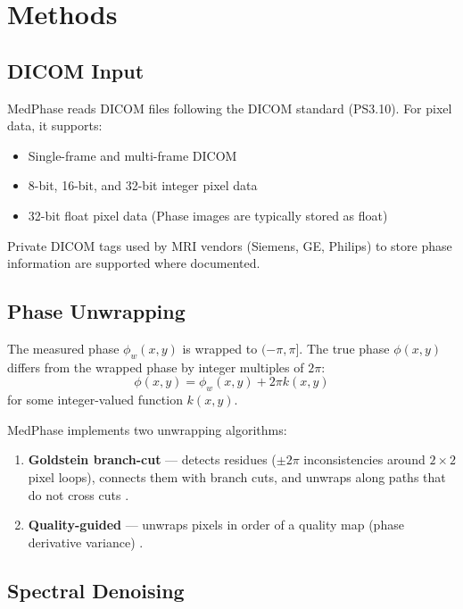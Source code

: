 \documentclass[11pt,a4paper]{article}
\begin{document}
\section{Methods}

\subsection{DICOM Input}

MedPhase reads DICOM files following the DICOM standard (PS3.10). For pixel data, it supports:
\begin{itemize}
\item Single-frame and multi-frame DICOM
\item 8-bit, 16-bit, and 32-bit integer pixel data
\item 32-bit float pixel data (Phase images are typically stored as float)
\end{itemize}

Private DICOM tags used by MRI vendors (Siemens, GE, Philips) to store phase information are supported where documented.

\subsection{Phase Unwrapping}

The measured phase $\phi_w(x,y)$ is wrapped to $(-\pi, \pi]$. The true phase $\phi(x,y)$ differs from the wrapped phase by integer multiples of $2\pi$:
\begin{equation}
\phi(x,y) = \phi_w(x,y) + 2\pi k(x,y)
\end{equation}
for some integer-valued function $k(x,y)$.

MedPhase implements two unwrapping algorithms:
\begin{enumerate}
\item \textbf{Goldstein branch-cut} — detects residues ($\pm 2\pi$ inconsistencies around $2\times2$ pixel loops), connects them with branch cuts, and unwraps along paths that do not cross cuts \cite{goldstein1988}.
\item \textbf{Quality-guided} — unwraps pixels in order of a quality map (phase derivative variance) \cite{ghiglia1994}.
\end{enumerate}

\subsection{Spectral Denoising}
\end{document}
